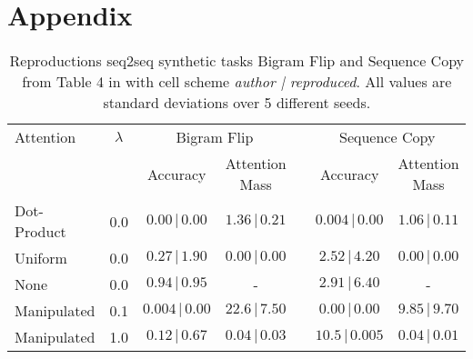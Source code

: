 \appendix
\section{Appendix}

\begin{table}[h!]
\centering
\caption{Reproductions seq2seq synthetic tasks Bigram Flip and Sequence Copy from Table 4 in \citet{pruthi-etal-2020-learning} with cell scheme \textit{author | reproduced}. All values are standard deviations over 5 different seeds.}
\label{tab:seq-to-seq-stdv-1}
\begin{tabular}{lcccccc} 
\toprule
Attention   & $\lambda$ & \multicolumn{2}{c}{Bigram Flip}                &  & \multicolumn{2}{c}{Sequence Copy}               \\ 
\cline{3-4}\cline{6-7}
            &           & Accuracy                   & Attention Mass                  &  & Accuracy                   & Attention Mass                   \\ 
\midrule
Dot-Product & 0.0       & $0.00\pmb{\,|\,}0.00$  & $1.36\pmb{\,|\,}0.21$ &  & $0.004\pmb{\,|\,}0.00$ & $1.06\pmb{\,|\,}0.11$  \\ 
\midrule
Uniform     & 0.0       & $0.27\pmb{\,|\,}1.90$  & $0.00\pmb{\,|\,}0.00$ &  & $2.52\pmb{\,|\,}4.20$  & $0.00\pmb{\,|\,}0.00$  \\
None        & 0.0       & $0.94\pmb{\,|\,}0.95$  & -                     &  & $2.91\pmb{\,|\,}6.40$  & -                      \\ 
\midrule
Manipulated & 0.1       & $0.004\pmb{\,|\,}0.00$ & $22.6\pmb{\,|\,}7.50$ &  & $0.00\pmb{\,|\,}0.00$  & $9.85\pmb{\,|\,}9.70$  \\
Manipulated & 1.0       & $0.12\pmb{\,|\,}0.67$  & $0.04\pmb{\,|\,}0.03$ &  & $10.5\pmb{\,|\,}0.005$ & $0.04\pmb{\,|\,}0.01$  \\
\bottomrule
\end{tabular}
\end{table}


